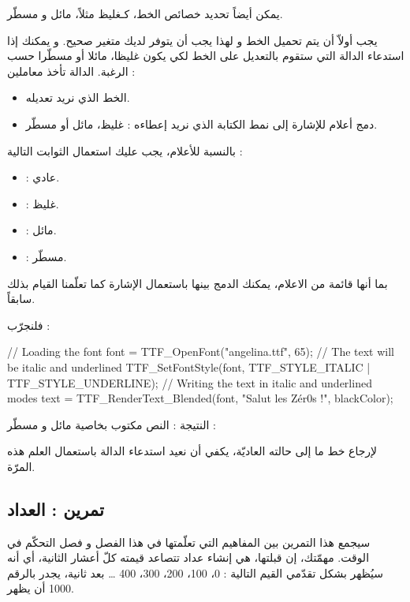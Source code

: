 يمكن أيضاً تحديد خصائص الخط، كـغليظ مثلاً، مائل و مسطّر. 

يجب أولاّ أن يتم تحميل الخط و لهذا يجب أن يتوفر لديك متغير
صحيح. و يمكنك إذا استدعاء الدالة 
التي ستقوم بالتعديل على الخط لكي يكون غليظا، مائلا أو مسطّرا حسب الرغبة. الدالة تأخذ معاملين :

\begin{itemize}
	\item الخط الذي نريد تعديله.
	\item دمج أعلام للإشارة إلى نمط الكتابة الذي نريد إعطاءه : غليظ، مائل أو مسطّر.
\end{itemize}

بالنسبة للأعلام، يجب عليك استعمال الثوابت التالية :

\begin{itemize}
	\item {} :
	عادي.
	\item {} :
	غليظ.
	\item {} :
	مائل.
	\item {} :
	مسطّر.
\end{itemize}

بما أنها قائمة من الاعلام، يمكنك الدمج بينها باستعمال الإشارة
\InlineCode{|}
كما تعلّمنا القيام بذلك سابقاً.

فلنجرّب :

\begin{Csource}
// Loading the font
font = TTF_OpenFont("angelina.ttf", 65);
// The text will be italic and underlined
TTF_SetFontStyle(font, TTF_STYLE_ITALIC | TTF_STYLE_UNDERLINE);
// Writing the text in italic and underlined modes
text = TTF_RenderText_Blended(font, "Salut les Zér0s !", blackColor);
\end{Csource}

النتيجة : النص مكتوب بخاصية مائل و مسطّر :


لإرجاع خط ما إلى حالته العاديّة، يكفي أن نعيد استدعاء الدالة
باستعمال العلم
هذه المرّة.

\subsection{تمرين : العداد}

سيجمع هذا التمرين بين المفاهيم التي تعلّمتها في هذا الفصل و فصل التحكّم في الوقت. مهمّتك، إن قبلتها، هي إنشاء عداد تتصاعد قيمته كلّ أعشار الثانية، أي أنه سيُظهر بشكل تقدّمي القيم التالية : 0، 100، 200، 300، 400 \dots
بعد ثانية، يجدر بالرقم 1000 أن يظهر.

